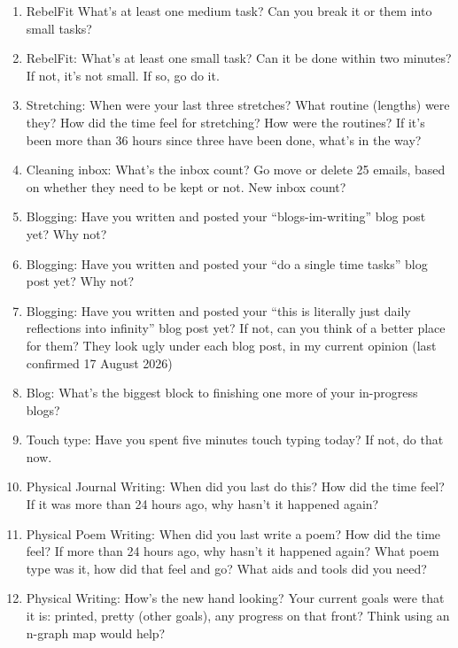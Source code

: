 \documentclass[12pt]{article}
\newcommand{\say}[1]{``#1''}
\renewcommand{\,}{\textsuperscript{,}}
\begin{document}
\begin{enumerate}
\item RebelFit What's at least one medium task? Can you break it or them into small tasks?

\item RebelFit: What's at least one small task? Can it be done within two minutes? If not, it's not small. If so, go do it.

\item Stretching: When were your last three stretches? What routine (lengths) were they? How did the time feel for stretching? How were the routines? If it's been more than 36 hours since three have been done, what's in the way?

\item Cleaning inbox: What's the inbox count? Go move or delete 25 emails, based on whether they need to be kept or not. New inbox count?

\item Blogging: Have you written and posted your \say{blogs-im-writing} blog post yet? Why not?

\item Blogging: Have you written and posted your \say{do a single time tasks} blog post yet? Why not?

\item Blogging: Have you written and posted your \say{this is literally just daily reflections into infinity} blog post yet? If not, can you think of a better place for them? They look ugly under each blog post, in my current opinion (last confirmed 17 August 2026)

\item Blog: What's the biggest block to finishing one more of your in-progress blogs?

\item Touch type: Have you spent five minutes touch typing today? If not, do that now.

\item Physical Journal Writing: When did you last do this? How did the time feel? If it was more than 24 hours ago, why hasn't it happened again?

\item Physical Poem Writing: When did you last write a poem? How did the time feel? If more than 24 hours ago, why hasn't it happened again? What poem type was it, how did that feel and go? What aids and tools did you need?

\item Physical Writing: How's the new hand looking? Your current goals were that it is: printed, pretty (other goals), any progress on that front? Think using an n-graph map would help?


\end{enumerate}
\end{document}
